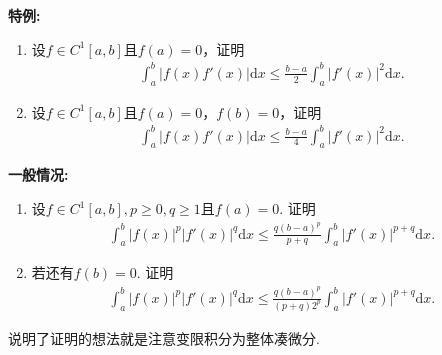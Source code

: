 \documentclass[../../main.tex]{subfiles}
\begin{document}
\begin{example}[$\,\,$opial不等式]\label{example:opial不等式}

\textbf{特例:}
\begin{enumerate}
\item 设\(f \in C^1[a,b]\)且\(f(a) = 0\)，证明
\begin{align*}
\int_{a}^{b}|f(x)f'(x)|\mathrm{d}x \leqslant \frac{b - a}{2}\int_{a}^{b}|f'(x)|^{2}\mathrm{d}x.
\end{align*}

\item 设\(f \in C^1[a,b]\)且\(f(a) = 0\)，\(f(b) = 0\)，证明
\begin{align*}
\int_{a}^{b}|f(x)f'(x)|\mathrm{d}x \leqslant \frac{b - a}{4}\int_{a}^{b}|f'(x)|^{2}\mathrm{d}x.
\end{align*} 
\end{enumerate}

\textbf{一般情况:}
\begin{enumerate}
\item 设\(f \in C^1[a,b], p\geqslant0, q\geqslant1\)且\(f(a) = 0\). 证明
\begin{align}
\int_{a}^{b}|f(x)|^{p}|f'(x)|^{q}\mathrm{d}x \leqslant \frac{q(b - a)^{p}}{p + q}\int_{a}^{b}|f'(x)|^{p + q}\mathrm{d}x. \label{equation----:::16.37}
\end{align}

\item 若还有\(f(b) = 0\). 证明
\begin{align}
\int_{a}^{b}|f(x)|^{p}|f'(x)|^{q}\mathrm{d}x \leqslant \frac{q(b - a)^{p}}{(p + q)2^{p}}\int_{a}^{b}|f'(x)|^{p + q}\mathrm{d}x. \label{equation----:::16.38}
\end{align}
\end{enumerate}
\end{example}
\begin{note}
说明了证明的想法就是注意变限积分为整体凑微分.
\end{note}
\end{document}
